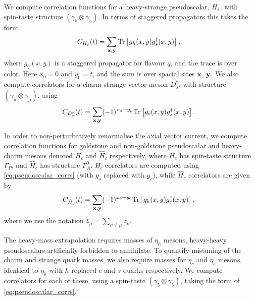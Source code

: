 We compute correlation functions for a heavy-strange pseudoscalar, $H_s$, with spin-taste structure $(\gamma_5\otimes \gamma_5)$. In terms of staggered propagators this takes the form
\begin{align}
  C_{H_s}(t) = \sum_{\bf{x},\bf{y}} \text{Tr}\left[ g_h(x,y) g_s^{\dagger}(x,y) \right],
  \label{eq:pseudoscalar_corrs}
\end{align}
where $g_q(x,y)$ is a staggered propagator for flavour $q$, and the trace is over color. Here $x_0=0$ and $y_0=t$, and the sum is over spacial sites {$\bf{x}$, $\bf{y}$}. We also compute correlators for a charm-strange vector meson $D_s^*$, with structure $(\gamma_{\mu}\otimes \gamma_{\mu})$, using
\begin{align}
  C_{D_s^*}(t) = \sum_{\bf{x},\bf{y}} (-1)^{x_{\mu}+y_{\mu}}\text{Tr}\left[ g_c(x,y) g_s^{\dagger}(x,y) \right].
\end{align}

In order to non-perturbatively renormalise the axial vector current, we compute correlation functions for goldstone and non-goldstone pseudoscalar and heavy-charm mesons denoted $H_c$ and $\hat{H}_c$ respectively, where $H_c$ has spin-taste structure $\Gamma_P$, and $\hat{H}_c$ has structure $\Gamma^0_A$. $H_c$ correlators are computed using \eqref{eq:pseudoscalar_corrs} (with $g_s$ replaced with $g_c$), while $\hat{H}_c$ correlators are given by
\begin{align}
  C_{\hat{H}_c}(t) = \sum_{\bf{x},\bf{y}}(-1)^{\bar{x}_0+\bar{y}_0} \text{Tr}\left[ g_h(x,y) g^{\dagger}_c(x,y) \right],
\end{align}
where we use the notation $\bar{z}_{\mu} = \sum_{\nu\neq\mu} z_{\nu}$.

The heavy-mass extrapolation requires masses of $\eta_h$ mesons, heavy-heavy pseudoscalars artificially forbidden to annihilate. To quantify mistuning of the charm and strange quark masses, we also require masses for $\eta_c$ and $\eta_s$ mesons, identical to $\eta_h$ with $h$ replaced $c$ and $s$ quarks respectively. We compute correlators for each of these, using a spin-taste $(\gamma_5\otimes \gamma_5)$, taking the form of \eqref{eq:pseudoscalar_corrs}.

